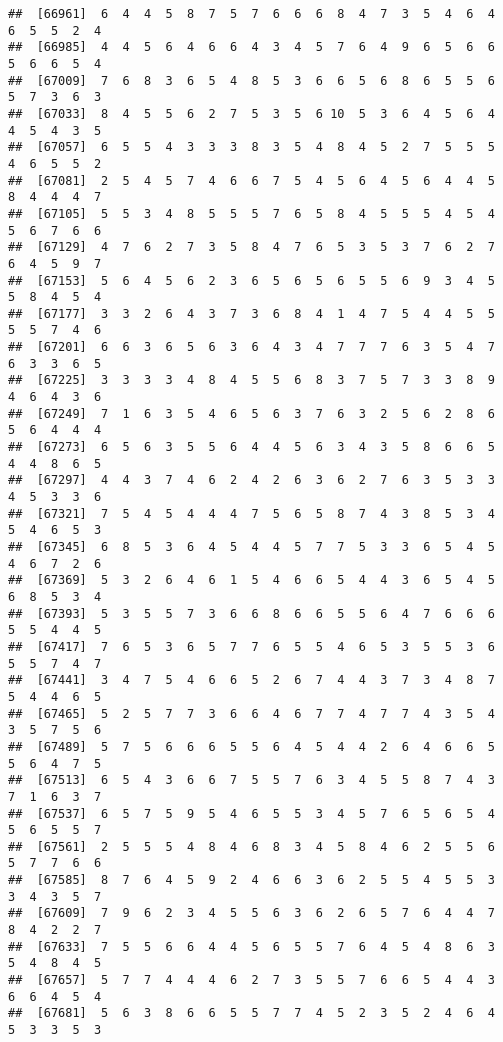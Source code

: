 \documentclass[
]{book}
\begin{document}
\begin{verbatim}
##  [66961]  6  4  4  5  8  7  5  7  6  6  6  8  4  7  3  5  4  6  4  6  5  5  2  4
##  [66985]  4  4  5  6  4  6  6  4  3  4  5  7  6  4  9  6  5  6  6  5  6  6  5  4
##  [67009]  7  6  8  3  6  5  4  8  5  3  6  6  5  6  8  6  5  5  6  5  7  3  6  3
##  [67033]  8  4  5  5  6  2  7  5  3  5  6 10  5  3  6  4  5  6  4  4  5  4  3  5
##  [67057]  6  5  5  4  3  3  3  8  3  5  4  8  4  5  2  7  5  5  5  4  6  5  5  2
##  [67081]  2  5  4  5  7  4  6  6  7  5  4  5  6  4  5  6  4  4  5  8  4  4  4  7
##  [67105]  5  5  3  4  8  5  5  5  7  6  5  8  4  5  5  5  4  5  4  5  6  7  6  6
##  [67129]  4  7  6  2  7  3  5  8  4  7  6  5  3  5  3  7  6  2  7  6  4  5  9  7
##  [67153]  5  6  4  5  6  2  3  6  5  6  5  6  5  5  6  9  3  4  5  5  8  4  5  4
##  [67177]  3  3  2  6  4  3  7  3  6  8  4  1  4  7  5  4  4  5  5  5  5  7  4  6
##  [67201]  6  6  3  6  5  6  3  6  4  3  4  7  7  7  6  3  5  4  7  6  3  3  6  5
##  [67225]  3  3  3  3  4  8  4  5  5  6  8  3  7  5  7  3  3  8  9  4  6  4  3  6
##  [67249]  7  1  6  3  5  4  6  5  6  3  7  6  3  2  5  6  2  8  6  5  6  4  4  4
##  [67273]  6  5  6  3  5  5  6  4  4  5  6  3  4  3  5  8  6  6  5  4  4  8  6  5
##  [67297]  4  4  3  7  4  6  2  4  2  6  3  6  2  7  6  3  5  3  3  4  5  3  3  6
##  [67321]  7  5  4  5  4  4  4  7  5  6  5  8  7  4  3  8  5  3  4  5  4  6  5  3
##  [67345]  6  8  5  3  6  4  5  4  4  5  7  7  5  3  3  6  5  4  5  4  6  7  2  6
##  [67369]  5  3  2  6  4  6  1  5  4  6  6  5  4  4  3  6  5  4  5  6  8  5  3  4
##  [67393]  5  3  5  5  7  3  6  6  8  6  6  5  5  6  4  7  6  6  6  5  5  4  4  5
##  [67417]  7  6  5  3  6  5  7  7  6  5  5  4  6  5  3  5  5  3  6  5  5  7  4  7
##  [67441]  3  4  7  5  4  6  6  5  2  6  7  4  4  3  7  3  4  8  7  5  4  4  6  5
##  [67465]  5  2  5  7  7  3  6  6  4  6  7  7  4  7  7  4  3  5  4  3  5  7  5  6
##  [67489]  5  7  5  6  6  6  5  5  6  4  5  4  4  2  6  4  6  6  5  5  6  4  7  5
##  [67513]  6  5  4  3  6  6  7  5  5  7  6  3  4  5  5  8  7  4  3  7  1  6  3  7
##  [67537]  6  5  7  5  9  5  4  6  5  5  3  4  5  7  6  5  6  5  4  5  6  5  5  7
##  [67561]  2  5  5  5  4  8  4  6  8  3  4  5  8  4  6  2  5  5  6  5  7  7  6  6
##  [67585]  8  7  6  4  5  9  2  4  6  6  3  6  2  5  5  4  5  5  3  3  4  3  5  7
##  [67609]  7  9  6  2  3  4  5  5  6  3  6  2  6  5  7  6  4  4  7  8  4  2  2  7
##  [67633]  7  5  5  6  6  4  4  5  6  5  5  7  6  4  5  4  8  6  3  5  4  8  4  5
##  [67657]  5  7  7  4  4  4  6  2  7  3  5  5  7  6  6  5  4  4  3  6  6  4  5  4
##  [67681]  5  6  3  8  6  6  5  5  7  7  4  5  2  3  5  2  4  6  4  5  3  3  5  3

\end{verbatim}
\end{document}
